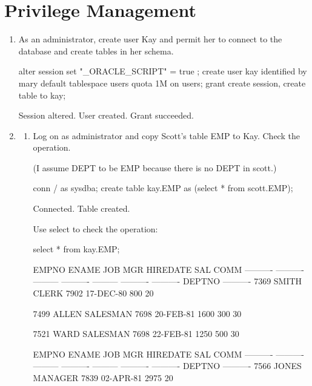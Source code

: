 \documentclass{article}
\begin{document}
\section{Privilege Management}
\begin{enumerate}
\item{As an administrator, create user Kay and permit her to connect to the database and create tables in her schema.}
\begin{sqlshell}
alter session set "_ORACLE_SCRIPT" = true ;
create user kay identified by mary default tablespace users quota 1M on users;
grant create session, create table to kay;
\end{sqlshell}
\begin{messageshell}
Session altered. 
User created.
Grant succeeded.
\end{messageshell}

\item{ }
 \begin{enumerate}
 \item{Log on as administrator and copy Scott’s table EMP to Kay. Check the operation.}
 
(I assume DEPT to be EMP because there is no DEPT in scott.)
\begin{sqlshell}
conn / as sysdba;
create table kay.EMP as (select * from scott.EMP);
\end{sqlshell}
\begin{messageshell}
Connected.
Table created.
\end{messageshell}
Use select to check the operation:
\begin{sqlshell}
select * from kay.EMP;
\end{sqlshell}
\begin{messageshell}
     EMPNO ENAME      JOB              MGR HIREDATE         SAL       COMM
---------- ---------- --------- ---------- --------- ---------- ----------
    DEPTNO
----------
      7369 SMITH      CLERK           7902 17-DEC-80        800
        20

      7499 ALLEN      SALESMAN        7698 20-FEB-81       1600        300
        30

      7521 WARD       SALESMAN        7698 22-FEB-81       1250        500
        30


     EMPNO ENAME      JOB              MGR HIREDATE         SAL       COMM
---------- ---------- --------- ---------- --------- ---------- ----------
    DEPTNO
----------
      7566 JONES      MANAGER         7839 02-APR-81       2975
        20


\end{messageshell}
\end{enumerate}
\end{enumerate}
\end{document}
